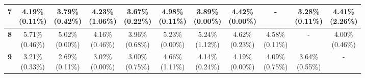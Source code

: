 \documentclass{report}
\begin{document}
\begin{center}
{\begin{tabular}{|c|c|c|c|c|c|c|c|c|c|c|}
  \textbf{7} & \makecell{4.19\% \\ (0.11\%)} & \makecell{3.79\% \\ (0.42\%)} & \makecell{4.23\% \\ (1.06\%)} & \makecell{3.67\% \\ (0.22\%)} & \makecell{4.98\% \\ (0.11\%)} & \makecell{3.89\% \\ (0.00\%)} & \makecell{4.42\% \\ (0.00\%)} & - & \makecell{3.28\% \\ (0.11\%)} & \makecell{4.41\% \\ (2.26\%)} \\ \hline
  \textbf{8} & \makecell{5.71\% \\ (0.46\%)} & \makecell{5.02\% \\ (0.00\%)} & \makecell{4.16\% \\ (0.46\%)} & \makecell{3.96\% \\ (0.68\%)} & \makecell{5.23\% \\ (0.00\%)} & \makecell{5.24\% \\ (1.12\%)} & \makecell{4.62\% \\ (0.23\%)} & \makecell{4.58\% \\ (0.11\%)} & - & \makecell{4.00\% \\ (0.46\%)} \\ \hline
  \textbf{9} & \makecell{3.21\% \\ (0.33\%)} & \makecell{2.69\% \\ (0.11\%)} & \makecell{3.02\% \\ (0.00\%)} & \makecell{3.00\% \\ (0.75\%)} & \makecell{4.66\% \\ (1.11\%)} & \makecell{4.14\% \\ (0.24\%)} & \makecell{4.19\% \\ (0.00\%)} & \makecell{4.09\% \\ (0.75\%)} & \makecell{3.64\% \\ (0.55\%)} & - \\ \hline
  \end{tabular}
}
\end{center}
\end{document}
